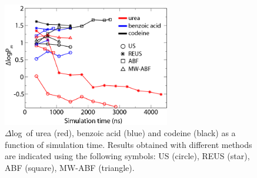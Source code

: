   \begin{figure}
    \centering
    \includegraphics[width=0.65\textwidth]{Figures/dlogP-recolor.png}
    \caption{ $\Delta$log\perm~of urea (red), benzoic acid (blue) and codeine (black) as a function of simulation time. %
    Results obtained with different methods are indicated using the following symbols: US (circle), REUS (star), ABF (square), MW-ABF (triangle). }
    \label{fig:deltaP}
  \end{figure}
